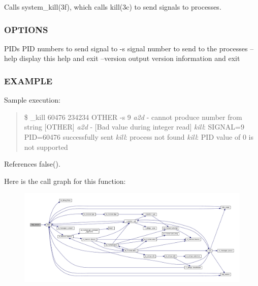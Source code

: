 Calls system\+\_\+kill(3f), which calls kill(3c) to send signals to processes. \subsubsection*{O\+P\+T\+I\+O\+NS}

P\+I\+Ds P\+ID numbers to send signal to -\/s signal number to send to the processes --help display this help and exit --version output version information and exit \subsubsection*{E\+X\+A\+M\+P\+LE}

Sample execution\+:

\begin{quote}
\$ \+\_\+kill 60476 234234 O\+T\+H\+ER -\/s 9 {\itshape a2d} -\/ cannot produce number from string \mbox{[}O\+T\+H\+ER\mbox{]} {\itshape a2d} -\/ \mbox{[}Bad value during integer read\mbox{]} {\itshape kill}\+: S\+I\+G\+N\+AL=9 P\+ID=60476 successfully sent {\itshape kill}\+: process not found {\itshape kill}\+: P\+ID value of 0 is not supported \end{quote}


References false().

Here is the call graph for this function\+:
\nopagebreak
\begin{figure}[H]
\begin{center}
\leavevmode
\includegraphics[width=350pt]{__kill_8f90_a39c21619b08a3c22f19e2306efd7f766_cgraph}
\end{center}
\end{figure}
